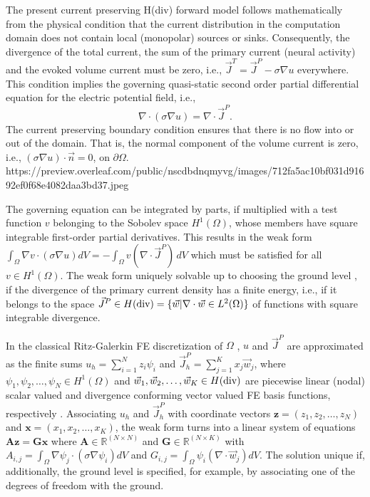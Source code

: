 \documentclass[5p]{elsarticle}
\begin{document}
The present current preserving H(div) forward model \citep{pursiainen2016}  follows mathematically from the physical condition that the current distribution in the computation domain does not contain local (monopolar) sources or sinks. Consequently, the divergence of the total current, the sum of the primary current (neural activity) and the evoked volume current must be zero, i.e., $\vec{J}^T = \vec{J}^P - \sigma \nabla u$ everywhere. This condition implies the governing quasi-static second order partial differential equation for the electric potential field, i.e.,  \begin{equation} \nabla \cdot (\sigma \nabla u) = \nabla \cdot \vec{J}^P. \end{equation} The current preserving boundary condition ensures that there is no flow into or out of the domain. That is, the normal component of the volume current is zero, i.e., $(\sigma \nabla u) \cdot \vec{n} = 0$, on $\partial \Omega$. https://preview.overleaf.com/public/nscdbdnqmyvg/images/712fa5ac10bf031d91692ef0f68e4082daa3bd37.jpeg

The governing equation can be integrated by parts, if multiplied with a test function $v$ belonging to the Sobolev space $H^1 (\Omega)$, whose members have  square integrable first-order partial derivatives. This results in the weak form $\int_{\Omega} \nabla v \cdot (\sigma \nabla u) dV = - \int_{\Omega} v ( \nabla \cdot \vec{J}^P ) \,  dV$ which must be satisfied for all $v \in H^1 (\Omega)$. The weak form uniquely solvable up to choosing the ground level \citep{evans1998, CHW:Dre2009}, if the divergence of the primary current density has a finite energy, i.e., if it belongs to the space $\vec{J}^P \in H(\hbox{div}) = \{\vec{w} | \nabla \cdot \vec{w} \in L^2 (\Omega) \}$ of functions with square integrable divergence.  

In the classical Ritz-Galerkin FE discretization of $\Omega$ \citep{braess2001}, $u$ and $\vec{J}^P$ are approximated as the  finite sums $u_h = \sum_{i=1}^N z_i \psi_i$ and $\vec{J}_{h}^P = \sum_{j=1}^K x_j \vec{w}_j$, where  $\psi_1, \psi_2, \dots, \psi_N \in H^1(\Omega)$ and   $\vec{w}_1, \vec{w}_2, \dots , \vec{w}_K \in H(\hbox{div})$ are  piecewise linear (nodal) scalar valued and divergence conforming vector valued FE basis functions, respectively \citep{pursiainen2016}.  Associating $u_h$ and $\vec{J}_{h}^P$ with coordinate vectors $\mathbf{z} = ( z_1, z_2, \dots, z_N )$ and $\mathbf{x} = (x_1, x_2, \dots , x_K)$, the weak form turns into a linear system of equations $\mathbf{Az} = \mathbf{Gx}$ where $\mathbf{A} \in \mathbb{R}^{(N \times N)}$  and $\mathbf{G} \in \mathbb{R}^{(N \times K)}$ with $A_{i,j}=\int_{\Omega} \nabla \psi_j \cdot ( \sigma \nabla \psi_i )dV$ and $G_{i,j} = \int_{\Omega} \psi_i (\nabla \cdot \vec{w}_j)dV$. The solution unique if, additionally, the ground level is specified, for example, by associating one of the degrees of freedom with the ground. 
\end{document}
